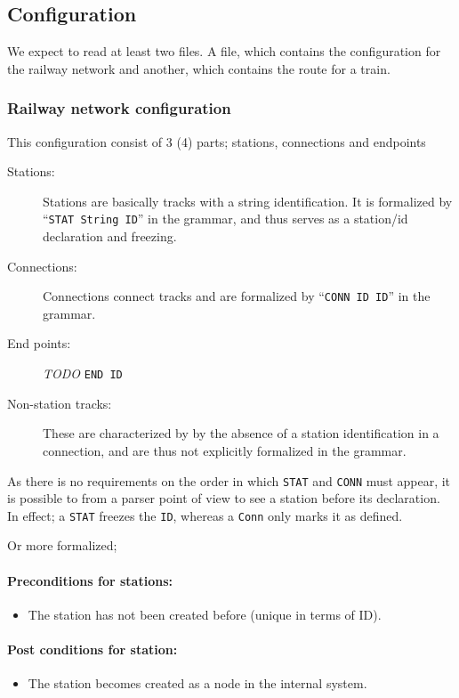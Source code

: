 \documentclass[10pt,a4paper]{article}
\def\Code#1{\texttt{#1}}
\begin{document}
\subsection{Configuration}
 
We expect to read at least two files. A file, which contains the configuration for the railway network and another, which contains the route for a train.  
 
\subsubsection{Railway network configuration}
 
This configuration consist of 3 (4) parts; stations, connections and endpoints

\begin{description}
\item[Stations:] Stations are basically tracks with a string identification. It is formalized by ``\Code{STAT String ID}'' in the grammar, and thus serves as a station/id declaration and freezing.
\item[Connections:] Connections connect tracks and are formalized by ``\Code{CONN ID ID}'' in the grammar.
\item[End points:] \emph{TODO} \Code{END ID}
\item[Non-station tracks:] These are characterized by by the absence of a station identification in a connection, and are thus not explicitly formalized in the grammar.
\end{description} 

As there is no requirements on the order in which \Code{STAT} and \Code{CONN} must appear, it is possible to from a parser point of view to see a station before its declaration. In effect; a \Code{STAT} freezes the \Code{ID}, whereas a \Code{Conn} only marks it as defined.
 
Or more formalized;
\paragraph{Preconditions for stations:}
\begin{itemize}
  \item The station has not been created before (unique in terms of ID).
\end{itemize}

\paragraph{Post conditions for station:}
\begin{itemize}
\item The station becomes created as a node in the internal system.
\end{itemize} 
\end{document}
